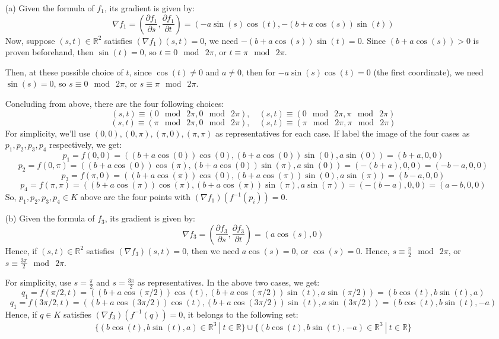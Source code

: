\documentclass{article}
\begin{document}
\begin{itemize}
    \item[(a)] Given the formula of $f_1$, its gradient is given by:
    $$\nabla f_1 = \left(\frac{\partial f_1}{\partial s},\frac{\partial f_1}{\partial t}\right)=(-a\sin(s)\cos(t), -(b+a\cos(s))\sin(t))$$
    Now, suppose $(s,t)\in \mathbb{R}^2$ satisfies $(\nabla f_1)(s,t)=0$, we need $-(b+a\cos(s))\sin(t)=0$. Since $(b+a\cos(s))>0$ is proven beforehand, then $\sin(t)=0$,
    so $t\equiv 0\mod\ 2\pi$, or $t\equiv \pi\mod\ 2\pi$.

    Then, at these possible choice of $t$, since $\cos(t)\neq 0$ and $a\neq 0$, then for $-a\sin(s)\cos(t)=0$ (the first coordinate), we need $\sin(s)=0$, so $s\equiv 0\mod\ 2\pi$, or $s\equiv \pi\mod\ 2\pi$.

    Concluding from above, there are the four following choices:
    $$(s,t)\equiv (0\mod\ 2\pi, 0\mod\ 2\pi),\quad (s,t)\equiv (0\mod\ 2\pi, \pi\mod\ 2\pi)$$
    $$(s,t)\equiv (\pi\mod\ 2\pi, 0\mod\ 2\pi),\quad (s,t)\equiv (\pi\mod\ 2\pi, \pi\mod\ 2\pi)$$
    For simplicity, we'll use $(0,0),(0,\pi),(\pi,0),(\pi,\pi)$ as representatives for each case. If label the image of the four cases as $p_1,p_2,p_3,p_4$ respectively, we get:
    $$p_1=f(0,0) = ((b+a\cos(0))\cos(0),(b+a\cos(0))\sin(0),a\sin(0)) = (b+a,0,0)$$
    $$p_2=f(0,\pi) = ((b+a\cos(0))\cos(\pi),(b+a\cos(0))\sin(\pi),a\sin(0)) = (-(b+a),0,0) = (-b-a,0,0)$$
    $$p_3=f(\pi,0) = ((b+a\cos(\pi))\cos(0),(b+a\cos(\pi))\sin(0),a\sin(\pi)) = (b-a,0,0)$$
    $$p_4=f(\pi,\pi) = ((b+a\cos(\pi))\cos(\pi),(b+a\cos(\pi))\sin(\pi),a\sin(\pi)) = (-(b-a),0,0)=(a-b,0,0)$$
    So, $p_1,p_2,p_3,p_4\in K$ above are the four points with $(\nabla f_1)(f^{-1}(p_i)) = 0$.

    \hfil

    \item[(b)] Given the formula of $f_3$, its gradient is given by:
    $$\nabla f_3 = \left(\frac{\partial f_3}{\partial s},\frac{\partial f_3}{\partial t}\right) = (a\cos(s),0)$$
    Hence, if $(s,t)\in\mathbb{R}^2$ satisfies $(\nabla f_3)(s,t)=0$, then we need $a\cos(s)=0$, or $\cos(s)=0$. Hence, $s\equiv \frac{\pi}{2}\mod\ 2\pi$, or $s\equiv \frac{3\pi}{2}\mod\ 2\pi$.

    For simplicity, use $s=\frac{\pi}{2}$ and $s=\frac{3\pi}{2}$ as representatives. 
    In the above two cases, we get:
    $$q_1 = f(\pi/2,t) = ((b+a\cos(\pi/2))\cos(t),(b+a\cos(\pi/2))\sin(t),a\sin(\pi/2)) = (b\cos(t),b\sin(t),a)$$
    $$q_1 = f(3\pi/2,t) = ((b+a\cos(3\pi/2))\cos(t),(b+a\cos(3\pi/2))\sin(t),a\sin(3\pi/2)) = (b\cos(t),b\sin(t),-a)$$
    Hence, if $q\in K$ satisfies $(\nabla f_3)(f^{-1}(q))=0$, it belongs to the following set:
    $$\{(b\cos(t),b\sin(t),a)\in\mathbb{R}^3\ |\ t\in\mathbb{R}\}\cup \{(b\cos(t),b\sin(t),-a)\in\mathbb{R}^3\ |\ t\in\mathbb{R}\}$$


\end{itemize}
\end{document}
